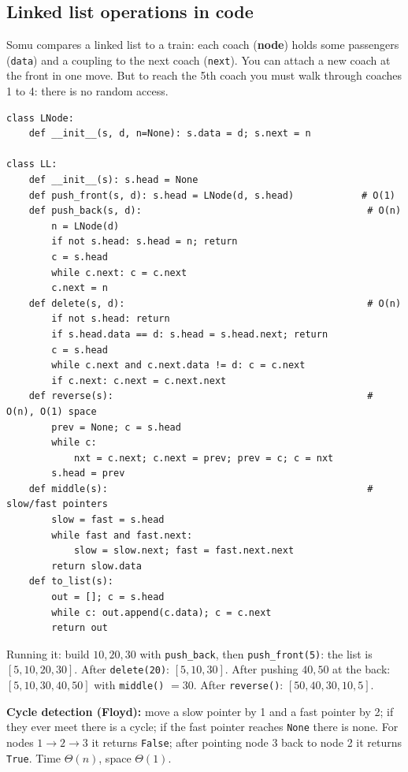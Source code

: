 \documentclass[11pt,a4paper]{article}
\newcommand{\py}[1]{\texttt{#1}}
\begin{document}
\subsection{Linked list operations in code}
\begin{story}
Somu compares a linked list to a train: each coach (\textbf{node}) holds some passengers (\py{data}) and a coupling to the next coach (\py{next}). You can attach a new coach at the front in one move. But to reach the 5th coach you must walk through coaches 1 to 4: there is no random access.
\end{story}
\begin{lstlisting}
class LNode:
    def __init__(s, d, n=None): s.data = d; s.next = n

class LL:
    def __init__(s): s.head = None
    def push_front(s, d): s.head = LNode(d, s.head)            # O(1)
    def push_back(s, d):                                        # O(n)
        n = LNode(d)
        if not s.head: s.head = n; return
        c = s.head
        while c.next: c = c.next
        c.next = n
    def delete(s, d):                                           # O(n)
        if not s.head: return
        if s.head.data == d: s.head = s.head.next; return
        c = s.head
        while c.next and c.next.data != d: c = c.next
        if c.next: c.next = c.next.next
    def reverse(s):                                             # O(n), O(1) space
        prev = None; c = s.head
        while c:
            nxt = c.next; c.next = prev; prev = c; c = nxt
        s.head = prev
    def middle(s):                                              # slow/fast pointers
        slow = fast = s.head
        while fast and fast.next:
            slow = slow.next; fast = fast.next.next
        return slow.data
    def to_list(s):
        out = []; c = s.head
        while c: out.append(c.data); c = c.next
        return out
\end{lstlisting}
Running it: build $10,20,30$ with \py{push\_back}, then \py{push\_front(5)}: the list is $[5,10,20,30]$. After \py{delete(20)}: $[5,10,30]$. After pushing $40,50$ at the back: $[5,10,30,40,50]$ with \py{middle()} $=30$. After \py{reverse()}: $[50,40,30,10,5]$.

\textbf{Cycle detection (Floyd):} move a slow pointer by 1 and a fast pointer by 2; if they ever meet there is a cycle; if the fast pointer reaches \py{None} there is none. For nodes $1\to2\to3$ it returns \py{False}; after pointing node 3 back to node 2 it returns \py{True}. Time $\Theta(n)$, space $\Theta(1)$.
\end{document}
